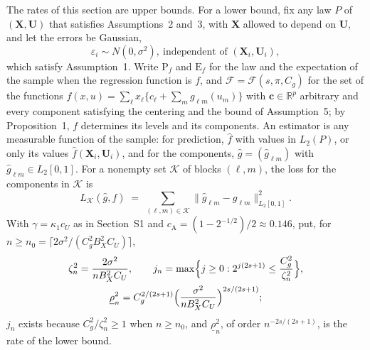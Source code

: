 \documentclass[10pt]{book}
\theoremstyle{definition}
\newcommand{\R}{\mathbb{R}}
\newcommand{\E}{\mathrm{E}}
\newcommand{\Prob}{\mathrm{P}}
\newcommand{\cv}{\ell}
\newcommand{\md}{m}
\newcommand{\lev}{j}
\newcommand{\bX}{\mathbf{X}}
\newcommand{\bU}{\mathbf{U}}
\newcommand{\lvl}[1]{c_{#1}}
\newcommand{\gcomp}[2]{g_{#1#2}}
\newcommand{\bc}{\mathbf{c}}
\newcommand{\Kcal}{\mathcal{K}}
\newcommand{\rlow}{\underline{\rho}_{n}}
\newcommand{\cA}{c_{\mathrm{A}}}
\begin{document}
{The rates of this section are upper bounds. For a lower bound, fix any law
$P$ of $(\bX,\bU)$ that satisfies Assumptions~2 and~3, with $\bX$ allowed to
depend on $\bU$, and let the errors be Gaussian,
\begin{equation}
  \label{eq:gauss}
  \varepsilon_i \sim N(0,\sigma^{2}),\ \text{independent of } (\bX_i,\bU_i),
\end{equation}
which satisfy Assumption~1. Write $\Prob_f$ and $\E_f$ for the law and the
expectation of the sample when the regression function is $f$, and
$\mathcal{F} = \mathcal{F}(s,\pi,C_g)$ for the set of the functions
$f(x,u) = \sum_{\cv}x_{\cv}\{\lvl{\cv} + \sum_{\md}\gcomp{\cv}{\md}(u_{\md})\}$
with $\bc \in \R^{p}$ arbitrary and every component satisfying the centering
and the bound of Assumption~5; by Proposition~1, $f$ determines its levels and
its components. An estimator is any measurable function of the sample: for
prediction, $\widehat{f}$ with values in $L_2(P)$, or only its values
$\widehat{f}(\bX_i,\bU_i)$, and for the components,
$\widehat{g} = (\widehat{g}_{\cv\md})$ with $\widehat{g}_{\cv\md} \in
L_2[0,1]$. For a nonempty set $\Kcal$ of blocks $(\cv,\md)$, the loss for the
components in $\Kcal$ is
\[
  L_{\Kcal}(\widehat{g},f) \;=\; \sum_{(\cv,\md)\in\Kcal}
  \lVert\widehat{g}_{\cv\md} - \gcomp{\cv}{\md}\rVert_{L_2[0,1]}^{2} .
\]
With $\gamma = \kappa_1c_U$ as in Section~S1 and
$\cA = (1-2^{-1/2})/2 \approx 0.146$, put, for
$n \ge n_{0} = \lceil 2\sigma^{2}/(C_g^{2}B_X^{2}C_U)\rceil$,
\begin{equation}
  \label{eq:lower-choices}
  \begin{gathered}
  \zeta_n^{2} = \frac{2\sigma^{2}}{nB_X^{2}C_U},
  \qquad
  \lev_n = \max\Bigl\{\lev \ge 0 : 2^{\lev(2s+1)} \le \frac{C_g^{2}}{\zeta_n^{2}}\Bigr\},
  \\
  \rlow^{2} = C_g^{2/(2s+1)}\Bigl(\frac{\sigma^{2}}{nB_X^{2}C_U}\Bigr)^{2s/(2s+1)} ;
  \end{gathered}
\end{equation}
$\lev_n$ exists because $C_g^{2}/\zeta_n^{2} \ge 1$ when $n \ge n_{0}$, and
$\rlow^{2}$, of order $n^{-2s/(2s+1)}$, is the rate of the lower bound.

}
\end{document}

